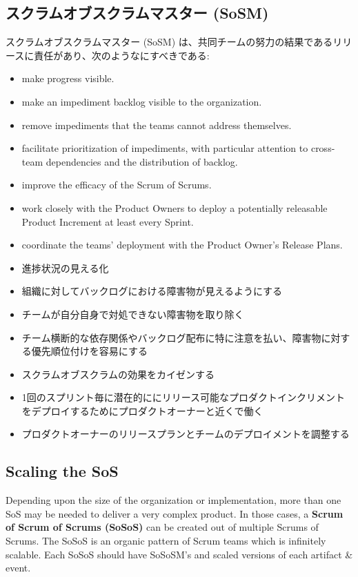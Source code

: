 \documentclass[12pt,a4paper,parskip=full]{scrartcl}
\begin{document}
\subsection{スクラムオブスクラムマスター (SoSM)}
スクラムオブスクラムマスター (SoSM) は、共同チームの努力の結果であるリリースに責任があり、次のようなにすべきである:
\begin{itemize}
\item make progress visible.
\item make an impediment backlog visible to the organization.
\item remove impediments that the teams cannot address themselves.
\item facilitate prioritization of impediments, with particular attention to cross-team
dependencies and the distribution of backlog.
\item improve the efficacy of the Scrum of Scrums.
\item work closely with the Product Owners to deploy a potentially
releasable Product Increment at least every Sprint.
\item coordinate the teams' deployment with the Product Owner's Release
Plans.
\end{itemize}
\fi
\begin{itemize}
\item 進捗状況の見える化
\item 組織に対してバックログにおける障害物が見えるようにする
\item チームが自分自身で対処できない障害物を取り除く
\item チーム横断的な依存関係やバックログ配布に特に注意を払い、障害物に対する優先順位付けを容易にする
\item スクラムオブスクラムの効果をカイゼンする
\item 1回のスプリント毎に潜在的ににリリース可能なプロダクトインクリメントをデプロイするためにプロダクトオーナーと近くで働く
\item プロダクトオーナーのリリースプランとチームのデプロイメントを調整する
\end{itemize}

\subsection{Scaling the SoS}
Depending upon the size of the organization or implementation, more than
one SoS may be needed to deliver a very complex product. In those cases, a
\textbf{Scrum of Scrum of Scrums (SoSoS)} can be created out of multiple
Scrums of Scrums. The SoSoS is an organic pattern of Scrum teams which is
infinitely scalable. Each SoSoS should have SoSoSM's and scaled versions of
each artifact \& event.
\end{document}
